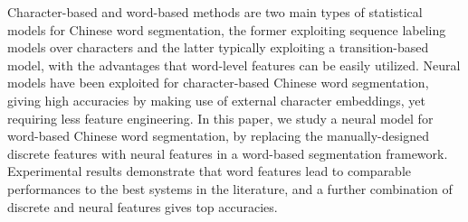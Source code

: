 Character-based and word-based methods are two main types of statistical models for Chinese word segmentation, the former exploiting sequence labeling models over characters and the latter typically exploiting a transition-based model, with the advantages that word-level features can be easily utilized. Neural models have been exploited for character-based Chinese word segmentation, giving high accuracies by making use of external character embeddings, yet requiring less feature engineering. In this paper, we study a neural model for word-based Chinese word segmentation, by replacing the manually-designed discrete features with neural features in a word-based segmentation framework. Experimental results demonstrate that word features lead to comparable performances to the best systems in the literature, and a further combination of discrete and neural features gives top accuracies.
